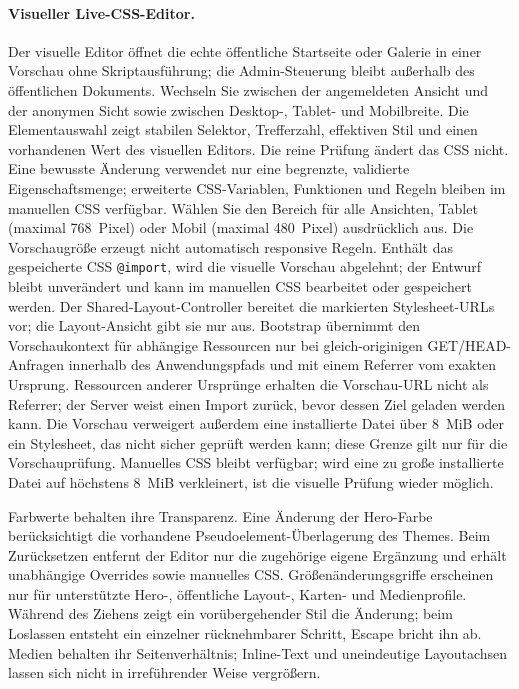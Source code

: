 \documentclass[11pt,a4paper]{article}
\newcommand{\filepath}[1]{\path{#1}}
\newcommand{\codeword}[1]{\nolinkurl{#1}}
\begin{document}
\paragraph{Visueller Live-CSS-Editor.} Der visuelle Editor öffnet die echte
öffentliche Startseite oder Galerie in einer Vorschau ohne Skriptausführung; die
Admin-Steuerung bleibt außerhalb des öffentlichen Dokuments. Wechseln Sie
zwischen der angemeldeten Ansicht und der anonymen Sicht sowie zwischen
Desktop-, Tablet- und Mobilbreite. Die Elementauswahl zeigt stabilen Selektor,
Trefferzahl, effektiven Stil und einen vorhandenen Wert des visuellen Editors.
Die reine Prüfung ändert das CSS nicht. Eine bewusste Änderung verwendet nur
eine begrenzte, validierte Eigenschaftsmenge; erweiterte CSS-Variablen,
Funktionen und Regeln bleiben im manuellen CSS verfügbar. Wählen Sie den Bereich
für alle Ansichten, Tablet (maximal 768~Pixel) oder Mobil (maximal 480~Pixel)
ausdrücklich aus. Die Vorschaugröße erzeugt nicht automatisch responsive Regeln.
Enthält das gespeicherte CSS \codeword{@import}, wird die visuelle Vorschau
abgelehnt; der Entwurf bleibt unverändert und kann im manuellen CSS bearbeitet
oder gespeichert werden. Der Shared-Layout-Controller bereitet die markierten
Stylesheet-URLs vor; die Layout-Ansicht gibt sie nur aus. Bootstrap übernimmt
den Vorschaukontext für abhängige Ressourcen nur bei gleich-originigen
GET/HEAD-Anfragen innerhalb des Anwendungspfads und mit einem Referrer vom
exakten Ursprung. Ressourcen anderer Ursprünge erhalten die Vorschau-URL nicht
als Referrer; der Server weist einen Import zurück, bevor dessen Ziel geladen
werden kann. Die Vorschau verweigert außerdem eine installierte Datei
\filepath{public/assets/custom.css} über 8~MiB oder ein Stylesheet, das nicht
sicher geprüft werden kann; diese Grenze gilt nur für die Vorschauprüfung.
Manuelles CSS bleibt verfügbar; wird eine zu große installierte Datei auf
höchstens 8~MiB verkleinert, ist die visuelle Prüfung wieder möglich.

Farbwerte behalten ihre Transparenz. Eine Änderung der Hero-Farbe berücksichtigt
die vorhandene Pseudoelement-Überlagerung des Themes. Beim Zurücksetzen entfernt
der Editor nur die zugehörige eigene Ergänzung und erhält unabhängige Overrides
sowie manuelles CSS. Größenänderungsgriffe erscheinen nur für unterstützte
Hero-, öffentliche Layout-, Karten- und Medienprofile. Während des Ziehens zeigt
ein vorübergehender Stil die Änderung; beim Loslassen entsteht ein einzelner
rücknehmbarer Schritt, Escape bricht ihn ab. Medien behalten ihr
Seitenverhältnis; Inline-Text und uneindeutige Layoutachsen lassen sich nicht in
irreführender Weise vergrößern.
\end{document}

